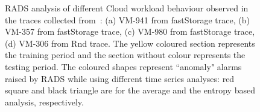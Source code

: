 \begin{figure}[!h]
                      \caption{RADS analysis of different Cloud workload behaviour observed in the traces collected from~\cite{workloadCCGRID:2015}: (a) VM-941 from fastStorage trace, (b) VM-357 from fastStorage trace, (c) VM-980 from fastStorage trace, (d) VM-306 from Rnd trace. The yellow coloured section represents the training period and the section without colour represents the testing period. The coloured shapes represent ``anomaly" alarms raised by RADS while using different time series analyses: red square and black triangle are for the average and the entropy based analysis, respectively. }



  \label{fig:offline_timeseries}
\end{figure}


